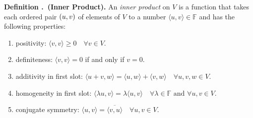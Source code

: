 \documentclass[11pt, letterpaper]{article}
\newcounter{index}[subsection]
\newenvironment*{df}[1]{\par\noindent\textbf{Definition \thesubsection.\stepcounter{index}\theindex\ (#1).}}{\par}
\def\F{\mathbb{F}}
\begin{document}
\begin{df}{Inner Product}
	An \textit{inner product} on $V$ is a function that takes each ordered pair $\qty(u,v)$ of elements of $V$ to a number $\langle u,v\rangle\in\F$	and has the following properties: 
	\begin{enumerate}
		\item positivity: $\langle v,v\rangle\geq 0\quad\forall v\in V$.
		\item definiteness: $\langle v,v\rangle=0$ if and only if $v=0$.
		\item additivity in first slot: $\langle u+v,w\rangle=\langle u,w\rangle+\langle v,w\rangle\quad\forall u,v,w\in V$.
		\item homogeneity in first slot: $\langle\lambda u,v\rangle=\lambda\langle u,v\rangle\quad\forall\lambda\in\F\text{ and }\forall u,v\in V$.
		\item conjugate symmetry: $\langle u,v\rangle=\overline{\langle v,u\rangle}\quad\forall u,v\in V.$
	\end{enumerate}
\end{df}
\end{document}
